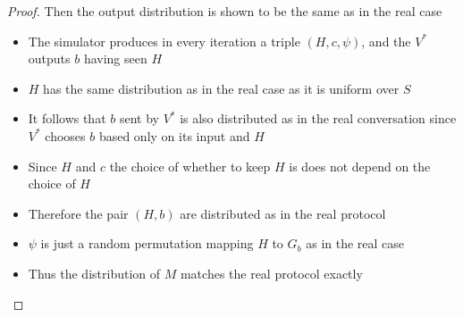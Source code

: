 \begin{itemize}
\begin{proof}
    Then the output distribution is shown to be the same as in the real case  
    \begin{itemize}
    	\item The simulator produces in every iteration a triple $(H,c,\psi)$, and the $V^*$ outputs $b$ having seen $H$
      \item $H$ has the same distribution as in the real case as it is uniform over $S$ 
      \item It follows that $b$ sent by $V^*$ is also distributed as in the real conversation since $V^*$ chooses $b$ based only on its input and $H$
      \item Since $H$ and $c$ the choice of whether to keep $H$ is does not depend on the choice of $H$ 
      \item Therefore the pair $(H,b)$ are distributed as in the real protocol
      \item $\psi$ is just a random permutation mapping $H$ to $G_b$ as in the real case
      \item Thus the distribution of $M$ matches the real protocol exactly
    \end{itemize}
  \end{proof}
\end{itemize}

